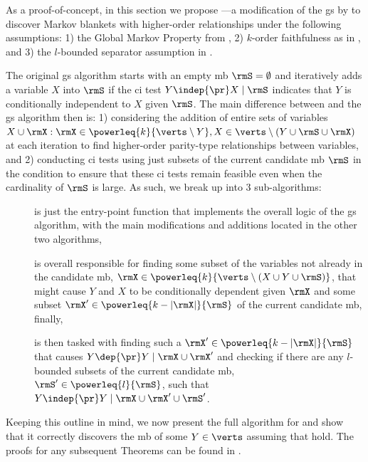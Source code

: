\documentclass[accepted]{uai2026} %
\theoremstyle{plain}
\theoremstyle{definition}
\theoremstyle{remark}
\begin{document}
As a proof-of-concept, in this section we propose {\method}---a
modification of the \acrfull{gs} by \citet{margaritis1999} to discover
Markov blankets with higher-order relationships under the following
assumptions: 1) the Global Markov Property from
, 2) $k$-order faithfulness as in
, and 3) the $l$-bounded separator assumption in
.

The original \gls{gs} algorithm starts with an empty \gls{mb}
$\rmS=\emptyset$ and iteratively adds a variable $X$ into $\rmS$ if the
\acrfull{ci} test $Y \indep{\pr} X \mid \rmS$ indicates that $Y$ is
conditionally independent to $X$ given $\rmS$. The main difference
between {\method} and the \gls{gs} algorithm then is: 1) considering the
addition of entire sets of variables
$X \cup \rmX : \rmX \in \powerleq{k}{\verts\setminus Y}, X \in
\verts\setminus(Y\cup\rmS\cup\rmX)$ at each iteration to
find higher-order parity-type relationships between variables, and 2)
conducting \gls{ci} tests using just subsets of the current candidate
\gls{mb} $\rmS$ in the condition to ensure that these \gls{ci}
tests remain feasible even when the cardinality of $\rmS$ is large.
As such, we break up {\method} into 3 sub-algorithms:
\begin{description}
\item[] is just the entry-point function that implements
  the overall logic of the \gls{gs} algorithm, with the main
  modifications and additions located in the other two algorithms,
\item[] is overall responsible for finding some
  subset of the variables not already in the candidate \gls{mb},
  $\rmX\in\powerleq{k}{\verts\setminus(X\cup Y\cup \rmS)}$, that might
  cause $Y$ and $X$ to be conditionally dependent given $\rmX$ and some
  subset $\rmX'\in\powerleq{k-|\rmX|}{\rmS}$ of the current candidate
  \gls{mb}, finally,
\item[] is then tasked with finding such a
  $\rmX'\in\powerleq{k-|\rmX|}{\rmS}$ that causes $Y \dep{\pr} Y \mid
  \rmX \cup \rmX'$ and checking if there are any $l$-bounded subsets of
  the current candidate \gls{mb}, $\rmS'\in\powerleq{l}{\rmS}$,
  such that $Y \indep{\pr} Y \mid \rmX \cup \rmX' \cup \rmS'$.
\end{description}

Keeping this outline in mind, we now present the full
algorithm for {\method} and show that it correctly discovers the \gls{mb} of some $Y\in\verts$ assuming that 
 hold. The proofs for
any subsequent Theorems can be found in .
\end{document}
